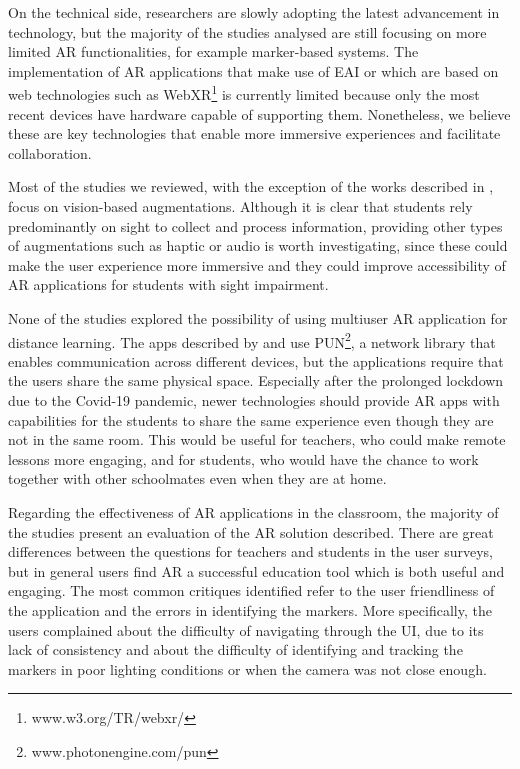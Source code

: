 On the technical side, researchers are slowly adopting the latest advancement in technology, but the majority of the studies analysed are still focusing on more limited \gls{AR} functionalities, for example marker-based systems. The implementation of \gls{AR} applications that make use of \gls{EAI} or which are based on web technologies such as WebXR\footnote{www.w3.org/TR/webxr/} is currently limited because only the most recent devices have hardware capable of supporting them. Nonetheless, we believe these are key technologies that enable more immersive experiences and facilitate collaboration. 

Most of the studies we reviewed, with the exception of the works described in \citep{chen2018application, kenoui2020teach, mikulowski2020multi}, focus on vision-based augmentations. Although it is clear that students rely predominantly on sight to collect and process information, providing other types of augmentations such as haptic or audio is worth investigating, since these could make the user experience more immersive and they could improve accessibility of \gls{AR} applications for students with sight impairment.

None of the studies explored the possibility of using multiuser AR application for distance learning. The apps described by \citet{oh2017hybrid} and \citet{lopez2020emofindar} use PUN\footnote{www.photonengine.com/pun}, a network library that enables communication across different devices, but the applications require that the users share the same physical space. Especially after the prolonged lockdown due to the Covid-19 pandemic, newer technologies should provide AR apps with capabilities for the students to share the same experience even though they are not in the same room. This would be useful for teachers, who could make remote lessons more engaging, and for students, who would have the chance to work together with other schoolmates even when they are at home.  

Regarding the effectiveness of AR applications in the classroom, the majority of the studies present an evaluation of the \gls{AR} solution described. There are great differences between the questions for teachers and students in the user surveys, but in general users find \gls{AR} a successful education tool which is both useful and engaging. The most common critiques identified refer to the user friendliness of the application and the errors in identifying the markers. More specifically, the users complained about the difficulty of navigating through the UI, due to its lack of consistency and about the difficulty of identifying and tracking the markers in poor lighting conditions or when the camera was not close enough.
